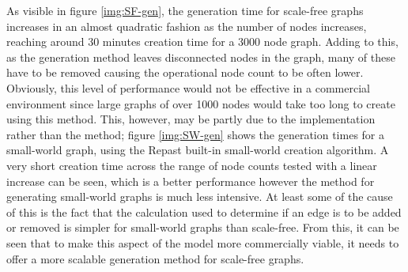 \documentclass[]{report}
\begin{document}
As visible in figure \ref{img:SF-gen}, the generation time for scale-free graphs increases in an almost quadratic fashion as the number of nodes increases, reaching around 30 minutes creation time for a 3000 node graph. Adding to this, as the generation method leaves disconnected nodes in the graph, many of these have to be removed causing the operational node count to be often lower. Obviously, this level of performance would not be effective in a commercial environment since large graphs of over 1000 nodes would take too long to create using this method. This, however, may be partly due to the implementation rather than the method; figure \ref{img:SW-gen} shows the generation times for a small-world graph, using the Repast built-in small-world creation algorithm. A very short creation time across the range of node counts tested with a linear increase can be seen, which is a better performance however the method for generating small-world graphs is much less intensive. At least some of the cause of this is the fact that the calculation used to determine if an edge is to be added or removed is simpler for small-world graphs than scale-free. From this, it can be seen that to make this aspect of the model more commercially viable, it needs to offer a more scalable generation method for scale-free graphs.
\end{document}
